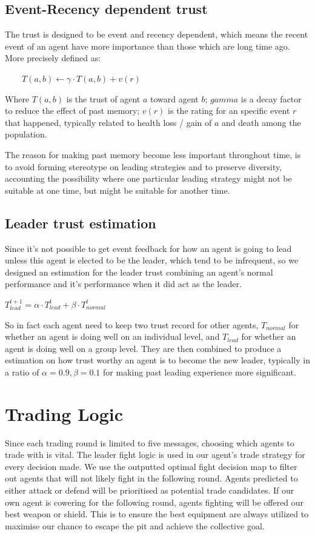 \subsection{Event-Recency dependent trust}
The trust is designed to be event and recency dependent, which means the recent event of an agent have more importance than those which are long time ago. More precisely defined as:
\begin{center}
$\qquad T(a,b) \leftarrow \gamma \cdot T(a,b) + v(r)$   
\end{center}
Where $T(a,b)$ is the trust of agent $a$ toward agent $b$; $gamma$ is a decay factor to reduce the effect of past memory; $v(r)$ is the rating for an specific event $r$ that happened, typically related to health loss / gain of $a$ and death among the population.

The reason for making past memory become less important throughout time, is to avoid forming stereotype on leading strategies and to preserve diversity, accounting the possibility where one particular leading strategy might not be suitable at one time, but might be suitable for another time.

\subsection{Leader trust estimation}
Since it's not possible to get event feedback for how an agent is going to lead unless this agent is elected to be the leader, which tend to be infrequent, so we designed an estimation for the leader trust combining an agent's normal performance and it's performance when it did act as the leader.
\begin{center}
$T_{lead}^{t+1} = \alpha \cdot T_{lead}^t + \beta \cdot T_{normal}^t$    
\end{center}
So in fact each agent need to keep two trust record for other agents, $T_{normal}$ for whether an agent is doing well on an individual level, and $T_{lead}$ for whether an agent is doing well on a group level. They are then combined to produce a estimation on how trust worthy an agent is to become the new leader, typically in a ratio of $\alpha=0.9, \beta=0.1$ for making past leading experience more significant.

\section{Trading Logic}

\noindent Since each trading round is limited to five messages, choosing which agents to trade with is vital. The leader fight logic is used in our agent’s trade strategy for every decision made. We use the outputted optimal fight decision map to filter out agents that will not likely fight in the following round. Agents predicted to either attack or defend will be prioritised as potential trade candidates. If our own agent is cowering for the following round, agents fighting will be offered our best weapon or shield. This is to ensure the best equipment are always utilized to maximise our chance to escape the pit and achieve the collective goal.

